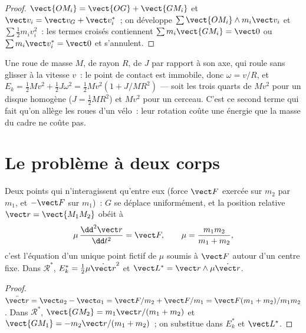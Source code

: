 \begin{proof}
$\vect{OM_i} = \vect{OG} + \vect{GM_i}$ et $\vect v_i = \vect v_G + \vect v_i^*$~;
on développe $\sum\vect{OM_i}\wedge m_i\vect v_i$ et $\sum\tfrac12 m_iv_i^2$~: les
termes croisés contiennent $\sum m_i\vect{GM_i} = \vect 0$ ou $\sum m_i\vect v_i^* = \vect 0$
et s'annulent.
\end{proof}

\begin{example}\label{ex:b1:systems-of-points:rolling}
Une roue de masse $M$, de rayon $R$, de  $J$ par rapport
à son axe, qui roule sans glisser à la vitesse $v$~: le point de contact
est immobile, donc $\omega = v/R$, et $E_k = \tfrac12 Mv^2 + \tfrac12 J\omega^2 = \tfrac12 Mv^2(1 +
J/MR^2)$ --- soit les trois quarts de $Mv^2$ pour un disque homogène
($J = \tfrac12 MR^2$) et $Mv^2$ pour un cerceau. C'est ce second terme qui
fait qu'on allège les roues d'un vélo~: leur rotation coûte une énergie
que la masse du cadre ne coûte pas.
\end{example}

\section{Le problème à deux corps}

\begin{proposition}\label{prop:b1:systems-of-points:twobody}
Deux points qui n'interagissent qu'entre eux (force $\vect F$ exercée sur
$m_2$ par $m_1$, et $-\vect F$ sur $m_1$)~: $G$ se déplace uniformément,
et la position relative $\vect r = \vect{M_1M_2}$ obéit à
\[
\mu\,\frac{\dd^2\vect r}{\dd t^2} = \vect F, \qquad \mu = \frac{m_1m_2}{m_1 + m_2},
\]
c'est l'équation d'un unique point fictif de \emph{} $\mu$
soumis à $\vect F$ autour d'un centre fixe. Dans $\mathcal R^*$, $E_k^* =
\tfrac12\mu\dot{\vect r}^2$ et $\vect L^* = \vect r\wedge\mu\dot{\vect r}$.
\end{proposition}

\begin{proof}
$\ddot{\vect r} = \vect a_2 - \vect a_1 = \vect F/m_2 + \vect F/m_1 = \vect F(m_1 +
m_2)/m_1m_2$. Dans $\mathcal R^*$, $\vect{GM_2} = m_1\vect r/(m_1 + m_2)$ et
$\vect{GM_1} = -m_2\vect r/(m_1 + m_2)$~; on substitue dans $E_k^*$ et $\vect L^*$.
\end{proof}

